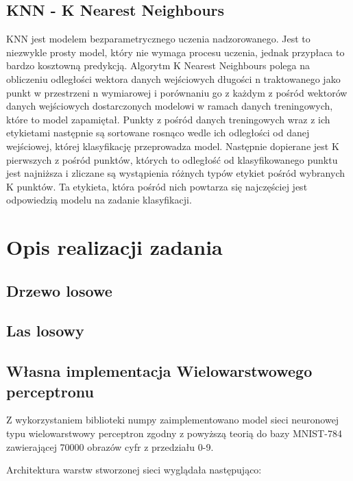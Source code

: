 \documentclass{article}
\begin{document}
\subsection{KNN - K Nearest Neighbours}
KNN jest modelem bezparametrycznego uczenia nadzorowanego. Jest to niezwykle prosty model,
 który nie wymaga procesu uczenia, jednak przypłaca to bardzo kosztowną predykcją.
Algorytm K Nearest Neighbours polega na obliczeniu odległości wektora danych wejściowych 
długości n traktowanego jako punkt w przestrzeni n wymiarowej i porównaniu go z każdym z 
pośród wektorów danych wejściowych dostarczonych modelowi w ramach danych treningowych, 
które to model zapamiętał. Punkty z pośród danych treningowych wraz z ich etykietami 
następnie są sortowane rosnąco wedle ich odległości od danej wejściowej, której 
klasyfikację przeprowadza model. Następnie dopierane jest K pierwszych z pośród 
punktów, których to odległość od klasyfikowanego punktu jest najniższa i zliczane 
są wystąpienia różnych typów etykiet pośród wybranych K punktów. Ta etykieta, 
która pośród nich powtarza się najczęściej jest odpowiedzią modelu na zadanie klasyfikacji.

\section{Opis realizacji zadania}

\subsection{Drzewo losowe}
\subsection{Las losowy}
\subsection{Własna implementacja Wielowarstwowego perceptronu}

Z wykorzystaniem biblioteki numpy zaimplementowano model sieci neuronowej 
typu wielowarstwowy perceptron zgodny z powyższą teorią do bazy MNIST-784 zawierającej 70000 obrazów cyfr z przedziału 0-9.


Architektura warstw stworzonej sieci wyglądała następująco:

\end{document}
